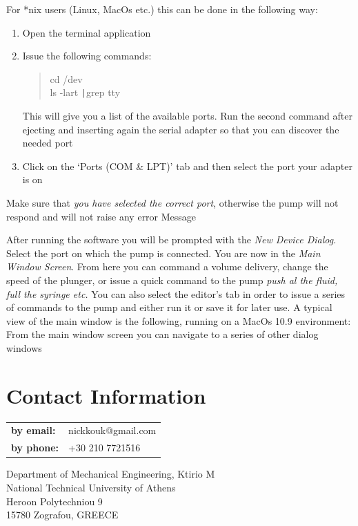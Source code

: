 \documentclass[a4paper]{article}
\newcommand{\faculty}{Department of Mechanical Engineering, Ktirio M\\
National Technical University of Athens\\
Heroon Polytechniou 9\\
15780 Zografou, GREECE\\}
\begin{document}
For *nix users (Linux, MacOs etc.) this can be done in the following way:
\begin{enumerate}
\item Open the terminal application
\item Issue the following commands:
    \begin{quote}
        cd /dev\\
        ls -lart \verb+|+grep tty\\
    \end{quote}
    This will give you a list of the available ports.
    Run the second command after ejecting and inserting again the serial adapter 
    so that you can discover the needed port
\item Click on the `Ports (COM \& LPT)' tab and then select the port your adapter is on
\end{enumerate}
Make sure that \emph{you have selected the correct port}, otherwise the pump will not respond and will
not raise any error Message

After running the software you will be prompted with the \emph{New Device Dialog}.
Select the port on which the pump is connected.
You are now in the \emph{Main Window Screen}. From here you can command a volume delivery,
change the speed of the plunger, or issue a quick command to the pump 
\textit{push al the fluid, full the syringe etc.}
You can also select the editor's tab in order to issue a series of commands to the pump 
and either run it or save it for later use.
A typical view of the main window is the following, running on a MacOs 10.9 environment:
From the main window screen you can navigate to a series of other dialog windows

\section{Contact Information}

\begin{tabular}{ll}
    \textbf{by email:} & nickkouk@gmail.com\\
    \textbf{by phone:} & +30 210 7721516\\
\end{tabular}

\vspace{2 mm}
\faculty
\end{document}
